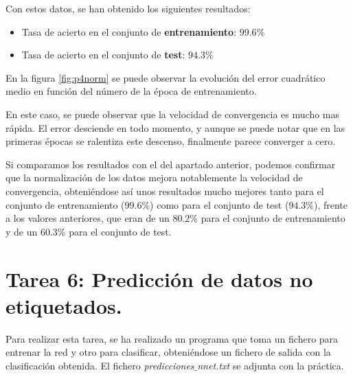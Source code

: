 \documentclass[spanish]{assignment}
\begin{document}
	Con estos datos, se han obtenido los siguientes resultados:
	\begin{itemize}
		\item Tasa de acierto en el conjunto de \textbf{entrenamiento}: $99.6\%$
		\item Tasa de acierto en el conjunto de \textbf{test}: $94.3\%$
	\end{itemize}
	
	
	En la figura \ref{fig:p4norm} se puede observar la evolución del error cuadrático medio en función del número de la época de entrenamiento. 
	
	En este caso, se puede observar que la velocidad de convergencia es mucho mas rápida. El error desciende en todo momento, y aunque se puede notar que en las primeras épocas se ralentiza este descenso, finalmente parece converger a cero. 
	
	Si comparamos los resultados con el del apartado anterior, podemos confirmar que la normalización de los datos mejora notablemente la velocidad de convergencia, obteniéndose así unos resultados mucho mejores tanto para el conjunto de entrenamiento ($99.6\%$) como para el conjunto de test ($94.3\%$), frente a los valores anteriores, que eran de un $80.2\%$ para el conjunto de entrenamiento y de un $60.3\%$ para el conjunto de test.
	
	\section{Tarea 6: Predicción de datos no etiquetados.}
	Para realizar esta tarea, se ha realizado un programa que toma un fichero para entrenar la red y otro para clasificar, obteniéndose un fichero de salida con la clasificación obtenida. El fichero \textit{predicciones$\_$nnet.txt} se adjunta con la práctica.
	
\end{document}
